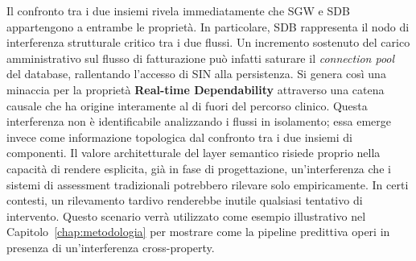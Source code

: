 Il confronto tra i due insiemi rivela immediatamente che SGW e SDB appartengono a entrambe le proprietà. 
In particolare, SDB rappresenta il nodo di interferenza strutturale critico tra i due flussi. 
Un incremento sostenuto del carico amministrativo sul flusso di fatturazione può infatti saturare 
il \emph{connection pool} del database, rallentando l'accesso di SIN alla persistenza. 
Si genera così una minaccia per la proprietà \textbf{Real-time Dependability} attraverso una catena 
causale che ha origine interamente al di fuori del percorso clinico. 
Questa interferenza non è identificabile analizzando i flussi in isolamento; essa emerge invece come 
informazione topologica dal confronto tra i due insiemi di componenti.
Il valore architetturale del layer semantico risiede proprio nella capacità di rendere
esplicita, già in fase di progettazione, un'interferenza che i sistemi di assessment
tradizionali potrebbero rilevare solo empiricamente. In certi contesti, un rilevamento tardivo
renderebbe inutile qualsiasi tentativo di intervento. Questo scenario verrà utilizzato come esempio illustrativo nel Capitolo~\ref{chap:metodologia} per mostrare
come la pipeline predittiva operi in presenza di un'interferenza cross-property.
